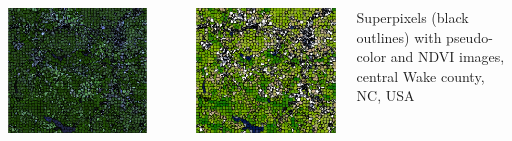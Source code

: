 \documentclass[25pt, margin=0mm, innermargin=25mm, blockverticalspace=25mm, colspace=25mm, subcolspace=8mm]{tikzposter}
\begin{document}
\begin{columns}
{\begin{minipage}{0.5\linewidth}
\begin{center}
\includegraphics[width=\textwidth]{superpixels_slic_pseudo}
\end{center}
\end{minipage}
~
\begin{minipage}{0.5\linewidth}
\begin{center}
\includegraphics[width=\textwidth]{superpixels_slic_colored}
\end{center}
\end{minipage}
\vspace{2mm}
\begin{center}
Superpixels (black outlines) with pseudo-color and NDVI images, central Wake county, NC, USA
\end{center}

}
\end{columns}
\end{document}
